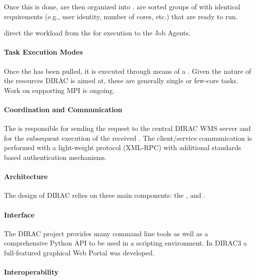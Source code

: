 \documentclass{sig-alternate}
\begin{document}
Once this is done,  are then organized into .
 are sorted groups of  with identical
requirements (e.g., user identity, number of cores, etc.) that are ready to run.

 direct the workload from the 
for execution to the Job Agents.

\paragraph{Task Execution Modes}

Once the  has been pulled, it is executed through means of a
.
Given the nature of the resources DIRAC is aimed at, these are generally single
or few-core tasks.
Work on supporting MPI is ongoing\cite{}.

\paragraph{Coordination and Communication}

The  is responsible for sending the 
request to the central DIRAC WMS server and for the subsequent execution of the
received .
The client/service communication is performed with a light-weight protocol
(XML-RPC) with additional standards based authentication mechanisms.

\paragraph{Architecture}

The design of DIRAC relies on three main components: the 
, and .

\paragraph{Interface}

The DIRAC project provides many command line tools as well as a comprehensive
Python API to be used in a scripting environment.
In DIRAC3 a full-featured graphical Web Portal was developed.

\paragraph{Interoperability}
\end{document}
